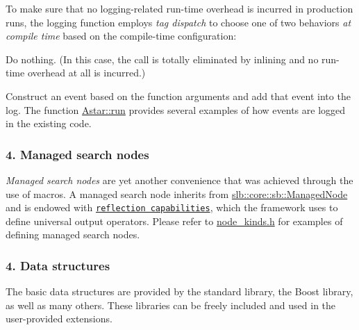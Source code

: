 To make sure that no logging-\/related run-\/time overhead is incurred in production runs, the logging function employs {\itshape tag dispatch} to choose one of two behaviors {\itshape at compile time} based on the compile-\/time configuration\+:
\begin{DoxyItemize}
\item Do nothing. (In this case, the call is totally eliminated by inlining and no run-\/time overhead at all is incurred.)
\item Construct an event based on the function arguments and add that event into the log. The function \hyperlink{structslb_1_1ext_1_1algorithm_1_1Astar_af46d0fe401539d7ae297dc4d059f5b5f}{Astar\+:\+:run} provides several examples of how events are logged in the existing code.
\end{DoxyItemize}\hypertarget{index_s-nodes}{}\subsubsection{4. Managed search nodes}\label{index_s-nodes}
{\itshape Managed search nodes} are yet another convenience that was achieved through the use of macros. A managed search node inherits from \hyperlink{structslb_1_1core_1_1sb_1_1ManagedNode}{slb\+::core\+::sb\+::\+Managed\+Node} and is endowed with \href{http://stackoverflow.com/a/11744832/2725810}{\tt reflection capabilities}, which the framework uses to define universal output operators. Please refer to \hyperlink{node__kinds_8h}{node\+\_\+kinds.\+h} for examples of defining managed search nodes.\hypertarget{index_s-structures}{}\subsubsection{4. Data structures}\label{index_s-structures}
The basic data structures are provided by the standard library, the Boost library, as well as many others. These libraries can be freely included and used in the user-\/provided extensions.

